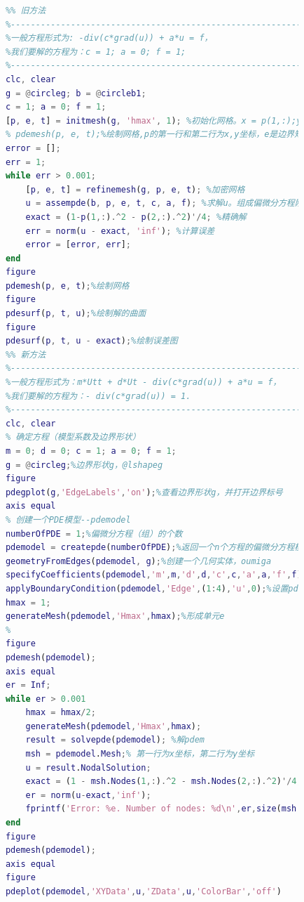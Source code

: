             \begin{lstlisting}[language = Matlab]
            %%%%%%%%%%%%%%% 示例1：单位圆上的Poisson方程 %%%%%%%%%%%%%%%%
            %% 旧方法
            %------------------------------------------------------------
            %一般方程形式为: -div(c*grad(u)) + a*u = f，
            %我们要解的方程为：c = 1; a = 0; f = 1;
            %------------------------------------------------------------
            clc, clear
            g = @circleg; b = @circleb1;
            c = 1; a = 0; f = 1;
            [p, e, t] = initmesh(g, 'hmax', 1); %初始化网格。x = p(1,:);y = p(2,:)
            % pdemesh(p, e, t);%绘制网格,p的第一行和第二行为x,y坐标，e是边界矩阵
            error = [];
            err = 1;
            while err > 0.001;
                [p, e, t] = refinemesh(g, p, e, t); %加密网格
                u = assempde(b, p, e, t, c, a, f); %求解u。组成偏微分方程刚度矩阵及其右边
                exact = (1-p(1,:).^2 - p(2,:).^2)'/4; %精确解
                err = norm(u - exact, 'inf'); %计算误差
                error = [error, err];
            end
            figure
            pdemesh(p, e, t);%绘制网格
            figure
            pdesurf(p, t, u);%绘制解的曲面
            figure
            pdesurf(p, t, u - exact);%绘制误差图
            %% 新方法
            %------------------------------------------------------------
            %一般方程形式为：m*Utt + d*Ut - div(c*grad(u)) + a*u = f，
            %我们要解的方程为：- div(c*grad(u)) = 1.
            %------------------------------------------------------------
            clc, clear
            % 确定方程（模型系数及边界形状）
            m = 0; d = 0; c = 1; a = 0; f = 1;
            g = @circleg;%边界形状g，@lshapeg
            figure
            pdegplot(g,'EdgeLabels','on');%查看边界形状g，并打开边界标号
            axis equal
            % 创建一个PDE模型--pdemodel
            numberOfPDE = 1;%偏微分方程（组）的个数
            pdemodel = createpde(numberOfPDE);%返回一个n个方程的偏微分方程模型容器。
            geometryFromEdges(pdemodel, g);%创建一个几何实体，oumiga
            specifyCoefficients(pdemodel,'m',m,'d',d,'c',c,'a',a,'f',f);%指定模型的系数
            applyBoundaryCondition(pdemodel,'Edge',(1:4),'u',0);%设置pdem的边界条件
            hmax = 1;
            generateMesh(pdemodel,'Hmax',hmax);%形成单元e
            %
            figure
            pdemesh(pdemodel);
            axis equal
            er = Inf;
            while er > 0.001
                hmax = hmax/2;
                generateMesh(pdemodel,'Hmax',hmax);
                result = solvepde(pdemodel); %解pdem
                msh = pdemodel.Mesh;% 第一行为x坐标，第二行为y坐标
                u = result.NodalSolution;
                exact = (1 - msh.Nodes(1,:).^2 - msh.Nodes(2,:).^2)'/4; %解析解
                er = norm(u-exact,'inf');
                fprintf('Error: %e. Number of nodes: %d\n',er,size(msh.Nodes,2));
            end
            figure
            pdemesh(pdemodel);
            axis equal
            figure
            pdeplot(pdemodel,'XYData',u,'ZData',u,'ColorBar','off')
            \end{lstlisting}

